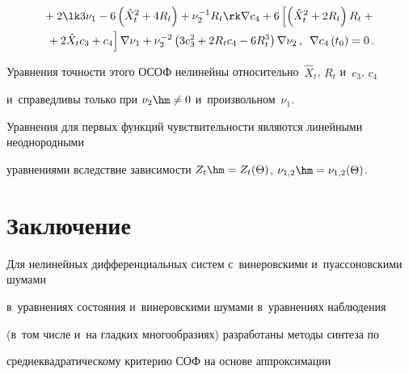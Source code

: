 \noindent

\begin{multline*}

{}+2 \lk 3 \nu_1 - 6 \left(\hat X_t^2 + 4 R_t \right) + \nu_2^{-1} 

R_t \rk \nabla c_4 + 6 \left[ \left( \hat X_t^2 + 2 R_t\right) R_t +{}\right.\\

\left.{}+ 2 \hat X_t c_3 + 

  c_4 \right] \nabla \nu_1 + \nu_2^{-2} \left( 3 c_3^2 + 2 R_t c_4 - 6 R_t^3\right) 

  \nabla \nu_2\,,\enskip \nabla c_4 \left(t_0\right) =0\,. %

  \end{multline*}

  

  \vspace*{-4pt}

  

  \noindent

Уравнения точности этого ОСОФ нелинейны относительно~$\hat X_t$, $R_t$ и~$c_3$, $c_4$ 

и~справедливы только при  $\nu_2 \hm\ne 0$ и~произвольном~$\nu_1$.

Уравнения для первых функций чувствительности являются линейными неоднородными 

уравнениями вследствие зависимости $Z_t\hm = Z_t(\Theta)$, $\nu_{1,2} \hm= 

\nu_{1,2} (\Theta)$.



\vspace*{-6pt}



\section{Заключение}



\vspace*{-2pt}



Для нелинейных дифференциальных систем с~винеровскими и~пуассоновскими шумами 

в~уравнениях состояния и~винеровскими шумами в~уравнениях наблюде\-ния 

(в~том числе и~на гладких многообразиях) разработаны методы синтеза по 

среднеквадратическому критерию СОФ на основе аппроксимации 

